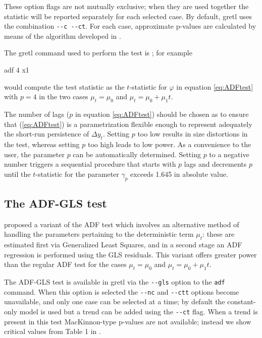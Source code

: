 These option flags are not mutually exclusive; when they are used
together the statistic will be reported separately for each selected
case.  By default, gretl uses the combination \verb|--c --ct|.
For each case, approximate p-values are calculated by means of the
algorithm developed in \cite{mackinnon96}.

The gretl command used to perform the test is ; for example
\begin{code}
adf 4 x1
\end{code}
would compute the test statistic as the $t$-statistic for $\varphi$ in
equation \ref{eq:ADFtest} with $p=4$ in the two cases $\mu_t = \mu_0$
and $\mu_t = \mu_0 + \mu_1 t$.

The number of lags ($p$ in equation \ref{eq:ADFtest}) should be chosen
as to ensure that (\ref{eq:ADFtest}) is a parametrization flexible
enough to represent adequately the short-run persistence of $\Delta
y_t$. Setting $p$ too low results in size distortions in the test,
whereas setting $p$ too high leads to low power. As a convenience
to the user, the parameter $p$ can be automatically determined.
Setting $p$ to a negative number triggers a sequential procedure that
starts with $p$ lags and decrements $p$ until the $t$-statistic for
the parameter $\gamma_p$ exceeds 1.645 in absolute value.

\subsection{The ADF-GLS test}
\label{sec:ADF-GLS}

\citet*{ERS96} proposed a variant of the ADF test which involves an
alternative method of handling the parameters pertaining to the
deterministic term $\mu_t$: these are estimated first via Generalized
Least Squares, and in a second stage an ADF regression is performed
using the GLS residuals. This variant offers greater power than the
regular ADF test for the cases $\mu_t = \mu_0$ and $\mu_t = \mu_0 +
\mu_1 t$. 

The ADF-GLS test is available in gretl via the \verb|--gls|
option to the \texttt{adf} command. When this option is selected the
\verb|--nc| and \verb|--ctt| options become unavailable, and only one
case can be selected at a time; by default the constant-only model is
used but a trend can be added using the \verb|--ct| flag.  When a
trend is present in this test MacKinnon-type p-values are not
available; instead we show critical values from Table 1 in
\cite{ERS96}.


